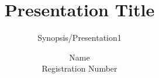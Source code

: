 \documentclass{beamer}
\begin{document}

\author[Name \quad \quad Registration Number ]{Name \\ Registration Number}
\title{Presentation Title}
\subtitle{Synopsis/Presentation1} %

\end{document}
